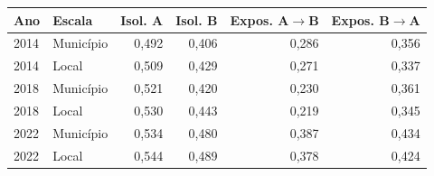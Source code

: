 \begin{tabular}{llrrrr}
\toprule
Ano & Escala & Isol. A & Isol. B & Expos. A$\to$B & Expos. B$\to$A \\
\midrule
2014 & Município & 0{,}492 & 0{,}406 & 0{,}286 & 0{,}356 \\
2014 & Local & 0{,}509 & 0{,}429 & 0{,}271 & 0{,}337 \\
2018 & Município & 0{,}521 & 0{,}420 & 0{,}230 & 0{,}361 \\
2018 & Local & 0{,}530 & 0{,}443 & 0{,}219 & 0{,}345 \\
2022 & Município & 0{,}534 & 0{,}480 & 0{,}387 & 0{,}434 \\
2022 & Local & 0{,}544 & 0{,}489 & 0{,}378 & 0{,}424 \\
\bottomrule
\end{tabular}
